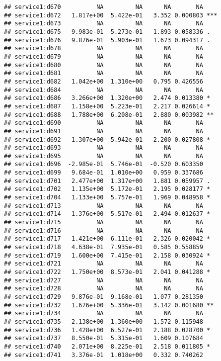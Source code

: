 \documentclass[
]{article}
\begin{document}
\begin{verbatim}
## service1:d670          NA         NA      NA       NA    
## service1:d672   1.817e+00  5.422e-01   3.352 0.000803 ***
## service1:d673          NA         NA      NA       NA    
## service1:d675   9.983e-01  5.273e-01   1.893 0.058336 .  
## service1:d676   9.876e-01  5.903e-01   1.673 0.094317 .  
## service1:d678          NA         NA      NA       NA    
## service1:d679          NA         NA      NA       NA    
## service1:d680          NA         NA      NA       NA    
## service1:d681          NA         NA      NA       NA    
## service1:d682   1.042e+00  1.310e+00   0.795 0.426556    
## service1:d684          NA         NA      NA       NA    
## service1:d686   3.266e+00  1.320e+00   2.474 0.013380 *  
## service1:d687   1.158e+00  5.223e-01   2.217 0.026614 *  
## service1:d688   1.788e+00  6.208e-01   2.880 0.003982 ** 
## service1:d690          NA         NA      NA       NA    
## service1:d691          NA         NA      NA       NA    
## service1:d692   1.307e+00  5.942e-01   2.200 0.027808 *  
## service1:d693          NA         NA      NA       NA    
## service1:d695          NA         NA      NA       NA    
## service1:d696  -2.985e-01  5.746e-01  -0.520 0.603350    
## service1:d699   9.684e-01  1.010e+00   0.959 0.337686    
## service1:d701   2.477e+00  1.317e+00   1.881 0.059957 .  
## service1:d702   1.135e+00  5.172e-01   2.195 0.028177 *  
## service1:d704   1.133e+00  5.757e-01   1.969 0.048958 *  
## service1:d713          NA         NA      NA       NA    
## service1:d714   1.376e+00  5.517e-01   2.494 0.012637 *  
## service1:d715          NA         NA      NA       NA    
## service1:d716          NA         NA      NA       NA    
## service1:d717   1.421e+00  6.111e-01   2.326 0.020042 *  
## service1:d718   4.638e-01  7.935e-01   0.585 0.558859    
## service1:d719   1.600e+00  7.415e-01   2.158 0.030924 *  
## service1:d721          NA         NA      NA       NA    
## service1:d722   1.750e+00  8.573e-01   2.041 0.041288 *  
## service1:d727          NA         NA      NA       NA    
## service1:d728          NA         NA      NA       NA    
## service1:d729   9.876e-01  9.168e-01   1.077 0.281350    
## service1:d732   1.676e+00  5.336e-01   3.142 0.001680 ** 
## service1:d734          NA         NA      NA       NA    
## service1:d735   2.138e+00  1.360e+00   1.572 0.115948    
## service1:d736   1.428e+00  6.527e-01   2.188 0.028700 *  
## service1:d737   8.550e-01  5.315e-01   1.609 0.107684    
## service1:d740   2.071e+00  8.225e-01   2.518 0.011805 *  
## service1:d741   3.376e-01  1.018e+00   0.332 0.740262    

\end{verbatim}
\end{document}

